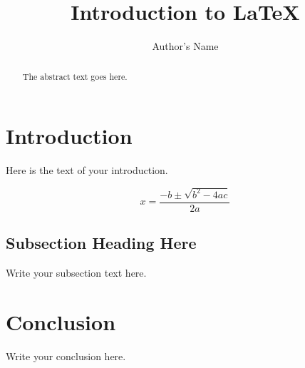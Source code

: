 \documentclass{article}
\begin{document}
\title{Introduction to \LaTeX{}}
\author{Author's Name}

\maketitle

\begin{abstract}
  The abstract text goes here.
\end{abstract}

\section{Introduction}
Here is the text of your introduction.

\begin{equation}
  \label{simple_equation}
  x=\frac{-b\pm\sqrt{b^2-4ac}}{2a}
\end{equation}

\subsection{Subsection Heading Here}
Write your subsection text here.

\section{Conclusion}
Write your conclusion here.
\end{document}
